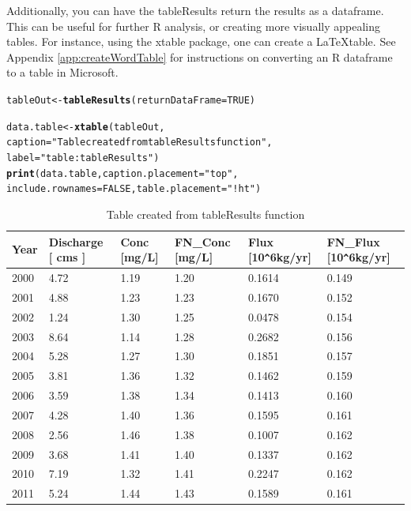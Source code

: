 \documentclass[a4paper,11pt]{article}\usepackage{graphicx, color}
\makeatletter
\newcommand{\hlfunctioncall}[1]{\textcolor[rgb]{0.501960784313725,0,0.329411764705882}{\textbf{#1}}}%
\newcommand{\hlstring}[1]{\textcolor[rgb]{0.6,0.6,1}{#1}}%
\newenvironment{kframe}{%
 \def\at@end@of@kframe{}%
 \ifinner\ifhmode%
  \def\at@end@of@kframe{\end{minipage}}%
  \begin{minipage}{\columnwidth}%
 \fi\fi%
 \def\FrameCommand##1{\hskip\@totalleftmargin \hskip-\fboxsep
 \colorbox{shadecolor}{##1}\hskip-\fboxsep
     \hskip-\linewidth \hskip-\@totalleftmargin \hskip\columnwidth}%
 \MakeFramed {\advance\hsize-\width
   \@totalleftmargin\z@ \linewidth\hsize
   \@setminipage}}%
 {\par\unskip\endMakeFramed%
 \at@end@of@kframe}
\newenvironment{knitrout}{}{} %
\makeatother
\begin{document}
\FloatBarrier

Additionally, you can have the tableResults return the results as a dataframe. This can be useful for further R analysis, or creating more visually appealing tables.  For instance, using the xtable package, one can create a \LaTeX table. See Appendix \ref{app:createWordTable} for instructions on converting an R dataframe to a table in Microsoft.


\begin{knitrout}
\color{fgcolor}\begin{kframe}
\begin{alltt}
tableOut <- \hlfunctioncall{tableResults}(returnDataFrame = TRUE)

data.table <- \hlfunctioncall{xtable}(tableOut, 
    caption=\hlstring{"Table created from tableResults function"},
    label=\hlstring{"table:tableResults"})
\hlfunctioncall{print}(data.table, caption.placement=\hlstring{"top"},
      include.rownames=FALSE,table.placement=\hlstring{"!ht"})
\end{alltt}
\end{kframe}
\end{knitrout}


\begin{table}[!ht]
\begin{center}
\caption{Table created from tableResults function}
\label{table:tableResults}
\begin{tabular}{llllll}
  \hline
Year & Discharge [   cms  ] & Conc [mg/L] & FN\_Conc [mg/L] & Flux [10\verb|^|6kg/yr] & FN\_Flux [10\verb|^|6kg/yr] \\ 
  \hline
   2000 &      4.72 &      1.19 &      1.20 &    0.1614 &     0.149 \\ 
     2001 &      4.88 &      1.23 &      1.23 &    0.1670 &     0.152 \\ 
     2002 &      1.24 &      1.30 &      1.25 &    0.0478 &     0.154 \\ 
     2003 &      8.64 &      1.14 &      1.28 &    0.2682 &     0.156 \\ 
     2004 &      5.28 &      1.27 &      1.30 &    0.1851 &     0.157 \\ 
     2005 &      3.81 &      1.36 &      1.32 &    0.1462 &     0.159 \\ 
     2006 &      3.59 &      1.38 &      1.34 &    0.1413 &     0.160 \\ 
     2007 &      4.28 &      1.40 &      1.36 &    0.1595 &     0.161 \\ 
     2008 &      2.56 &      1.46 &      1.38 &    0.1007 &     0.162 \\ 
     2009 &      3.68 &      1.41 &      1.40 &    0.1337 &     0.162 \\ 
     2010 &      7.19 &      1.32 &      1.41 &    0.2247 &     0.162 \\ 
     2011 &      5.24 &      1.44 &      1.43 &    0.1589 &     0.161 \\ 
   \hline
\end{tabular}
\end{center}
\end{table}
\end{document}
